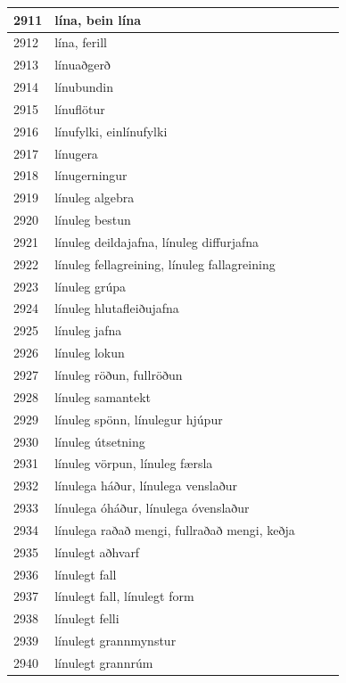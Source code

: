 \begin{longtable}{p{}|p{}|p{}|p{}|p{}}
\hline
2911 & lína, bein lína &  &  &  \\
\hline
2912 & lína, ferill &  &  &  \\
\hline
2913 & línuaðgerð &  &  &  \\
\hline
2914 & línubundin &  &  &  \\
\hline
2915 & línuflötur &  &  &  \\
\hline
2916 & línufylki, einlínufylki &  &  &  \\
\hline
2917 & línugera &  &  &  \\
\hline
2918 & línugerningur &  &  &  \\
\hline
2919 & línuleg algebra &  &  &  \\
\hline
2920 & línuleg bestun &  &  &  \\
\hline
2921 & línuleg deildajafna, línuleg diffurjafna &  &  &  \\
\hline
2922 & línuleg fellagreining, línuleg fallagreining &  &  &  \\
\hline
2923 & línuleg grúpa &  &  &  \\
\hline
2924 & línuleg hlutafleiðujafna &  &  &  \\
\hline
2925 & línuleg jafna &  &  &  \\
\hline
2926 & línuleg lokun &  &  &  \\
\hline
2927 & línuleg röðun, fullröðun &  &  &  \\
\hline
2928 & línuleg samantekt &  &  &  \\
\hline
2929 & línuleg spönn, línulegur hjúpur &  &  &  \\
\hline
2930 & línuleg útsetning &  &  &  \\
\hline
2931 & línuleg vörpun, línuleg færsla &  &  &  \\
\hline
2932 & línulega háður, línulega venslaður &  &  &  \\
\hline
2933 & línulega óháður, línulega óvenslaður &  &  &  \\
\hline
2934 & línulega raðað mengi, fullraðað mengi, keðja &  &  &  \\
\hline
2935 & línulegt aðhvarf &  &  &  \\
\hline
2936 & línulegt fall &  &  &  \\
\hline
2937 & línulegt fall, línulegt form &  &  &  \\
\hline
2938 & línulegt felli &  &  &  \\
\hline
2939 & línulegt grannmynstur &  &  &  \\
\hline
2940 & línulegt grannrúm &  &  &  \\

\end{longtable}
